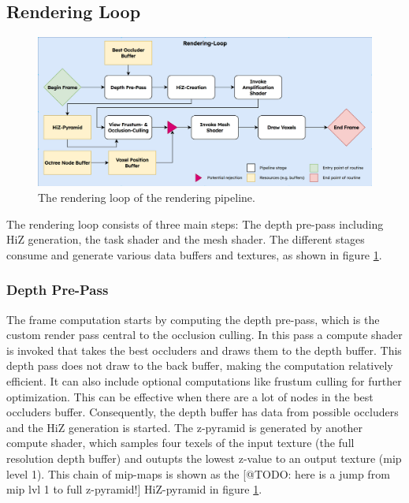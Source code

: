 \subsection*{Rendering Loop} \label{sec-rendering-loop}

\begin{figure}[h]
    \centering
    \includegraphics[width=\linewidth]{images/graphics/rendering-loop.jpg}
    \caption{The rendering loop of the rendering pipeline.}
    \label{fig:pipeline-loop}
\end{figure}

\noindent
The rendering loop consists of three main steps: The depth pre-pass including \ac{HiZ} generation, the 
task shader and the mesh shader. The different stages consume and generate various data buffers 
and textures, as shown in figure \ref{fig:pipeline-loop}. 

\subsubsection*{Depth Pre-Pass} \label{subsec-depth-prepass}

The frame computation starts by computing the depth pre-pass, which is the custom render pass central 
to the occlusion culling. In this pass a compute shader is invoked that takes the best occluders and 
draws them to the depth buffer. This depth pass does not draw to the back buffer, making the computation 
relatively efficient. It can also include optional computations like frustum culling for further 
optimization. This can be effective when there are a lot of nodes in the best occluders buffer. 
Consequently, the depth buffer has data from possible occluders and the \ac{HiZ} generation is started. 
The z-pyramid is generated by another compute shader, which samples four texels of the input texture 
(the full resolution depth buffer) and outupts the lowest z-value to an output texture (mip level 1). 
This chain of mip-maps is shown as the [@TODO: here is a jump from mip lvl 1 to full z-pyramid!]
\ac{HiZ}-pyramid in figure \ref{fig:pipeline-loop}.



